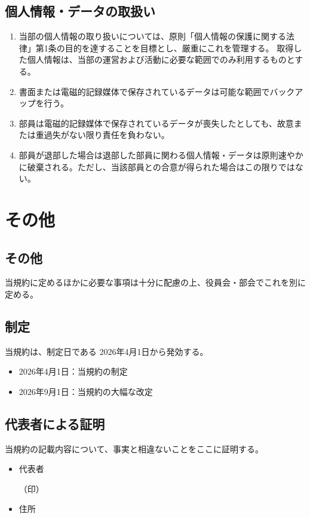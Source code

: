\documentclass[12pt, unicode, a4paper]{ltjsreport}
\begin{document}
    \section{個人情報・データの取扱い}
        \begin{enumerate}
            \item 当部の個人情報の取り扱いについては、原則「個人情報の保護に関する法律」第1条の目的を達することを目標とし、厳重にこれを管理する。
            取得した個人情報は、当部の運営および活動に必要な範囲でのみ利用するものとする。
            \item 書面または電磁的記録媒体で保存されているデータは可能な範囲でバックアップを行う。
            \item 部員は電磁的記録媒体で保存されているデータが喪失したとしても、故意または重過失がない限り責任を負わない。
            \item 部員が退部した場合は退部した部員に関わる個人情報・データは原則速やかに破棄される。ただし、当該部員との合意が得られた場合はこの限りではない。
        \end{enumerate}


\chapter{その他}
    \section{その他}
        当規約に定めるほかに必要な事項は十分に配慮の上、役員会・部会でこれを別に定める。

    \section*{制定}
        当規約は、制定日である 2026年4月1日から発効する。
        \begin{itemize}
            \item 2026年4月1日：当規約の制定
            \item 2026年9月1日：当規約の大幅な改定
        \end{itemize}

    \section*{代表者による証明}
        当規約の記載内容について、事実と相違ないことをここに証明する。
        \begin{itemize}
            \item 代表者
            \begin{flushright}
                （印）
            \end{flushright}
            \item 住所
        \end{itemize}
\end{document}
